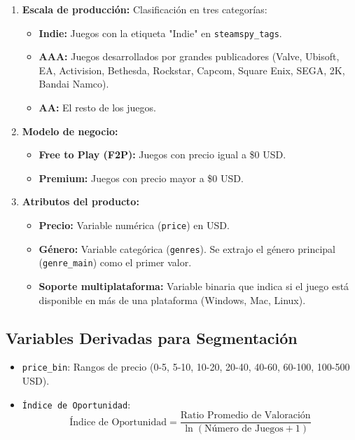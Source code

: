 \documentclass[oneside,11pt]{Latex/Classes/PhDthesisPSnPDF}
\begin{document}
\begin{enumerate}
  \item \textbf{Escala de producción:} Clasificación en tres categorías:
  \begin{itemize}
    \item \textbf{Indie:} Juegos con la etiqueta "Indie" en \texttt{steamspy\_tags}.
    \item \textbf{AAA:} Juegos desarrollados por grandes publicadores (Valve, Ubisoft, EA, Activision, Bethesda, Rockstar, Capcom, Square Enix, SEGA, 2K, Bandai Namco).
    \item \textbf{AA:} El resto de los juegos.
  \end{itemize}
  
  \item \textbf{Modelo de negocio:}
  \begin{itemize}
    \item \textbf{Free to Play (F2P):} Juegos con precio igual a \$0 USD.
    \item \textbf{Premium:} Juegos con precio mayor a \$0 USD.
  \end{itemize}
  
  \item \textbf{Atributos del producto:}
  \begin{itemize}
    \item \textbf{Precio:} Variable numérica (\texttt{price}) en USD.
    \item \textbf{Género:} Variable categórica (\texttt{genres}). Se extrajo el género principal (\texttt{genre\_main}) como el primer valor.
    \item \textbf{Soporte multiplataforma:} Variable binaria que indica si el juego está disponible en más de una plataforma (Windows, Mac, Linux).
  \end{itemize}
\end{enumerate}

\subsection{Variables Derivadas para Segmentación}

\begin{itemize}
  \item \texttt{price\_bin}: Rangos de precio (0-5, 5-10, 10-20, 20-40, 40-60, 60-100, 100-500 USD).
  \item \texttt{Índice de Oportunidad}: 
  $$\text{Índice de Oportunidad} = \frac{\text{Ratio Promedio de Valoración}}{\ln(\text{Número de Juegos} + 1)}$$
\end{itemize}
\end{document}
